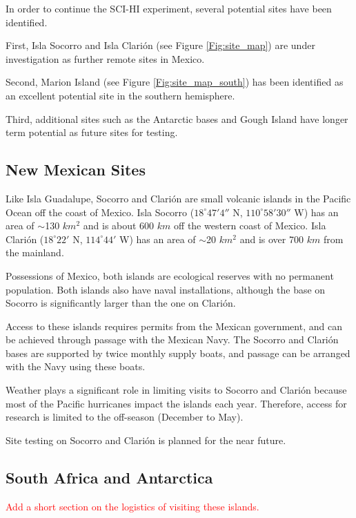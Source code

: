 In order to continue the SCI-HI experiment, several potential sites have been identified.

First, Isla Socorro and Isla Clari\'{o}n (see Figure \ref{Fig:site_map}) are under investigation as further remote sites in Mexico.

Second, Marion Island (see Figure \ref{Fig:site_map_south}) has been identified as an excellent potential site in the southern hemisphere.

Third, additional sites such as the Antarctic bases and Gough Island have longer term potential as future sites for testing. 

\subsection{New Mexican Sites}
Like Isla Guadalupe, Socorro and Clari\'{o}n are small volcanic islands in the Pacific Ocean off the coast of Mexico. Isla Socorro ($18^\circ 47' 4''$ N, $110^\circ 58' 30''$ W) has an area of $\sim$130 $km^2$ and is about 600 $km$ off the western coast of Mexico. Isla Clari\'{o}n ($18^\circ 22'$ N, $114^\circ 44'$ W) has an area of $\sim$20 $km^2$ and is over 700 $km$ from the mainland.

Possessions of Mexico, both islands are ecological reserves with no permanent population. Both islands also have naval installations, although the base on Socorro is significantly larger than the one on Clari\'{o}n. 

Access to these islands requires permits from the Mexican government, and can be achieved through passage with the Mexican Navy. The Socorro and Clari\'{o}n bases are supported by twice monthly supply boats, and passage can be arranged with the Navy using these boats. 

Weather plays a significant role in limiting visits to Socorro and Clari\'{o}n because most of the Pacific hurricanes impact the islands each year. Therefore, access for research is limited to the off-season (December to May). 

Site testing on Socorro and Clari\'{o}n is planned for the near future.

\subsection{South Africa and Antarctica}

\textcolor{red}{Add a short section on the logistics of visiting these islands.}






